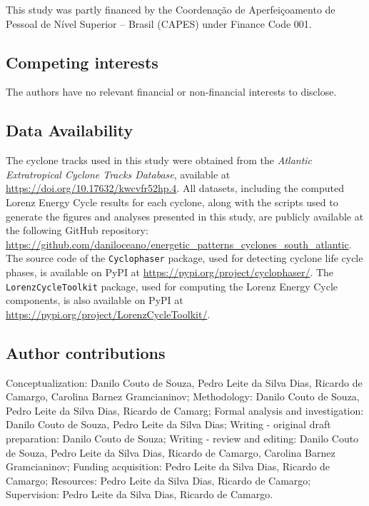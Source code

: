 \documentclass[pdflatex,sn-chicago]{sn-jnl}%
\theoremstyle{plain}
\theoremstyle{definition}
\theoremstyle{remark}
\theoremstyle{definition}
\begin{document}
This study was partly financed by the Coordenação de Aperfeiçoamento de Pessoal de Nível Superior – Brasil (CAPES) under Finance Code 001.

\subsection*{Competing interests}

The authors have no relevant financial or non-financial interests to disclose.

\subsection*{Data Availability}

The cyclone tracks used in this study were obtained from the \textit{Atlantic Extratropical Cyclone Tracks Database}, available at \url{https://doi.org/10.17632/kwcvfr52hp.4}. All datasets, including the computed Lorenz Energy Cycle results for each cyclone, along with the scripts used to generate the figures and analyses presented in this study, are publicly available at the following GitHub repository: \url{https://github.com/daniloceano/energetic_patterns_cyclones_south_atlantic}. The source code of the \texttt{Cyclophaser} package, used for detecting cyclone life cycle phases, is available on PyPI at \url{https://pypi.org/project/cyclophaser/}. The \texttt{LorenzCycleToolkit} package, used for computing the Lorenz Energy Cycle components, is also available on PyPI at \url{https://pypi.org/project/LorenzCycleToolkit/}.

\subsection*{Author contributions}

Conceptualization: Danilo Couto de Souza, Pedro Leite da Silva Dias, Ricardo de Camargo, Carolina Barnez Gramcianinov; Methodology: Danilo Couto de Souza, Pedro Leite da Silva Dias, Ricardo de Camarg; Formal analysis and investigation: Danilo Couto de Souza, Pedro Leite da Silva Dias; Writing - original draft preparation: Danilo Couto de Souza; Writing - review and editing: Danilo Couto de Souza, Pedro Leite da Silva Dias, Ricardo de Camargo, Carolina Barnez Gramcianinov; Funding acquisition: Pedro Leite da Silva Dias, Ricardo de Camargo; Resources: Pedro Leite da Silva Dias, Ricardo de Camargo; Supervision: Pedro Leite da Silva Dias, Ricardo de Camargo.

\end{document}
